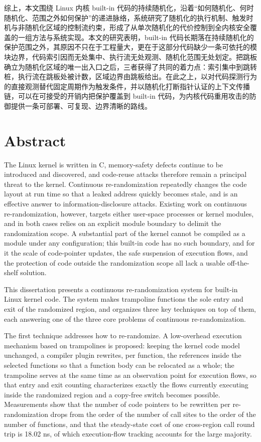 综上，本文围绕 Linux 内核 built-in 代码的持续随机化，沿着“如何随机化、何时随机化、范围之外如何保护”的递进脉络，系统研究了随机化的执行机制、触发时机与非随机化区域的控制流约束，形成了从单次随机化的代价控制到全内核安全覆盖的一组方法与系统实现。本文的研究表明，built-in 代码长期落在持续随机化的保护范围之外，其原因不只在于工程量大，更在于这部分代码缺少一条可依托的模块边界，代码索引因而无处集中、执行流无处观测、随机化范围无处划定。把跳板确立为随机化区域的唯一出入口之后，三者获得了共同的着力点：索引集中到跳转桩，执行流在跳板处被计数，区域边界由跳板给出。在此之上，以对代码探测行为的直接观测替代固定周期作为触发条件，并以随机化打断指针认证的上下文传播链，可以在可接受的开销内把保护覆盖到 built-in 代码，为内核代码重用攻击的防御提供一条可部署、可复现、边界清晰的路线。

\intobmk\chapter*{Abstract}%

The Linux kernel is written in C, memory-safety defects continue to be introduced and discovered, and code-reuse attacks therefore remain a principal threat to the kernel. Continuous re-randomization repeatedly changes the code layout at run time so that a leaked address quickly becomes stale, and is an effective answer to information-disclosure attacks. Existing work on continuous re-randomization, however, targets either user-space processes or kernel modules, and in both cases relies on an explicit module boundary to delimit the randomization scope. A substantial part of the kernel cannot be compiled as a module under any configuration; this built-in code has no such boundary, and for it the scale of code-pointer updates, the safe suspension of execution flows, and the protection of code outside the randomization scope all lack a usable off-the-shelf solution.

This dissertation presents a continuous re-randomization system for built-in Linux kernel code. The system makes trampoline functions the sole entry and exit of the randomized region, and organizes three key techniques on top of them, each answering one of the three core problems of continuous re-randomization.

The first technique addresses how to re-randomize. A low-overhead execution mechanism based on trampolines is proposed: keeping the kernel code model unchanged, a compiler plugin rewrites, per function, the references inside the selected functions so that a function body can be relocated as a whole; the trampoline serves at the same time as an observation point for execution flows, so that entry and exit counting characterizes exactly the flows currently executing inside the randomized region and a copy-free switch becomes possible. Measurements show that the number of code pointers to be rewritten per re-randomization drops from the order of the number of call sites to the order of the number of functions, and that the steady-state cost of one cross-region call round trip is 18.02 ns, of which execution-flow tracking accounts for the large majority.

